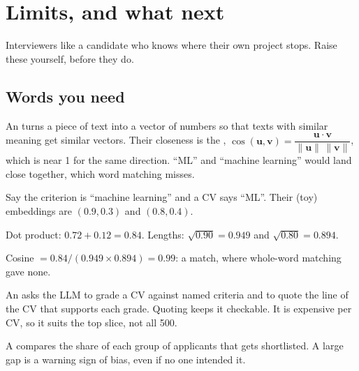 \chapter{Limits, and what next}
\label{ch:limits}

Interviewers like a candidate who knows where their own project stops. Raise these yourself, before they do.

\section{Words you need}

\begin{definition}
An  turns a piece of text into a vector of numbers so that texts with similar meaning get similar vectors. Their closeness is the , $\cos(\mathbf u, \mathbf v) = \dfrac{\mathbf u \cdot \mathbf v}{\lVert \mathbf u \rVert\,\lVert \mathbf v \rVert}$, which is near 1 for the same direction. ``ML'' and ``machine learning'' would land close together, which word matching misses.
\end{definition}

\begin{example}
Say the criterion is ``machine learning'' and a CV says ``ML''. Their (toy) embeddings are $(0.9, 0.3)$ and $(0.8, 0.4)$.
\begin{steps}
  \item Dot product: $0.72 + 0.12 = 0.84$. Lengths: $\sqrt{0.90} = 0.949$ and $\sqrt{0.80} = 0.894$.
  \item Cosine $= 0.84/(0.949 \times 0.894) = 0.99$: a match, where whole-word matching gave none.
\end{steps}
\end{example}

\begin{definition}
An  asks the LLM to grade a CV against named criteria and to quote the line of the CV that supports each grade. Quoting keeps it checkable. It is expensive per CV, so it suits the top slice, not all 500.
\end{definition}

\begin{definition}
A  compares the share of each group of applicants that gets shortlisted. A large gap is a warning sign of bias, even if no one intended it.
\end{definition}

